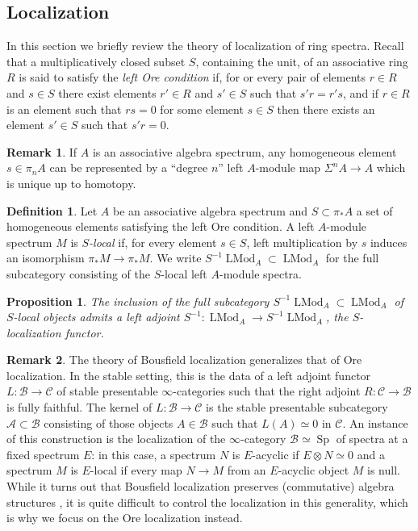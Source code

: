 \documentclass{article}
\newtheorem{proposition}{Proposition}[subsection]
\theoremstyle{definition}
\newtheorem{definition}{Definition}[subsection]
\newtheorem{remark}{Remark}[subsection]
\newcommand{\A}{\mathcal{A}}
\newcommand{\B}{\mathcal{B}}
\newcommand{\C}{\mathcal{C}}
\renewcommand{\i}{\infty}
\DeclareMathOperator{\LMod}{LMod}
\DeclareMathOperator{\Sp}{Sp}
\begin{document}
\subsection{Localization}

In this section we briefly review the theory of localization of ring spectra.
Recall that a multiplicatively closed subset $S$, containing the unit, of an associative ring $R$ is said to
satisfy the {\em left Ore condition} if, for or every pair of elements $r\in R$ and $s\in S$ there exist elements $r'\in R$ and $s'\in S$ such that
$s'r = r's$, and if $r\in R$ is an element such that $rs = 0$ for some element $s\in S$ then there exists an
element $s'\in S$ such that $s'r=0$.

\begin{remark}
If $A$ is an associative algebra spectrum, any homogeneous element $s\in\pi_n A$ can be represented by a ``degree $n$'' left $A$-module map $\Sigma^n A\to A$ which is unique up to homotopy.
\end{remark}
\begin{definition}
Let $A$ be an associative algebra spectrum and $S\subset\pi_* A$ a set of homogeneous elements satisfying the left Ore condition.
A left $A$-module spectrum $M$ is {\em $S$-local} if, for every element $s\in S$, left multiplication by $s$ induces an isomorphism $\pi_* M\to\pi_* M$.
We write $S^{-1}\LMod_A\subset\LMod_A$ for the full subcategory consisting of the $S$-local left $A$-module spectra.
\end{definition}

\begin{proposition}{\em \cite[Remark 7.2.3.18]{HA}}
The inclusion of the full subcategory $S^{-1}\LMod_A\subset\LMod_A$ of $S$-local objects admits a left adjoint $S^{-1}:\LMod_A\to S^{-1}\LMod_A$, the $S$-localization functor.
\end{proposition}

\begin{remark}
The theory of Bousfield localization generalizes that of Ore localization.
In the stable setting, this is the data of a left adjoint functor $L:\B\to\C$ of stable presentable $\i$-categories such that the right adjoint $R:\C\to\B$ is fully faithful.
The kernel of $L:\B\to\C$ is the stable presentable subcategory $\A\subset\B$ consisting of those objects $A\in\B$ such that $L(A)\simeq 0$ in $\C$.
An instance of this construction is the localization of the $\i$-category $\B\simeq\Sp$ of spectra at a fixed spectrum $E$: in this case, a spectrum $N$ is $E$-acyclic if $E\otimes N\simeq 0$ and a spectrum $M$ is $E$-local if every map $N\to M$ from an $E$-acyclic object $M$ is null.
While it turns out that Bousfield localization preserves (commutative) algebra structures \cite[Proposition 2.2.1.9]{HA}, it is quite difficult to control the localization in this generality, which is why we focus on the Ore localization instead.
\end{remark}
\end{document}
